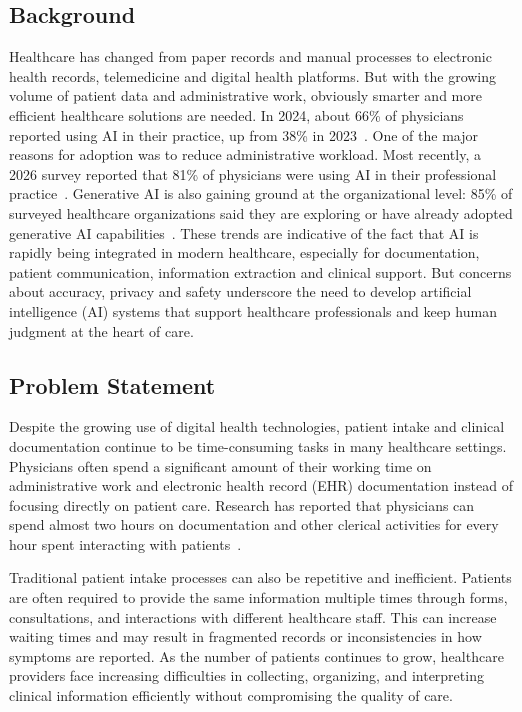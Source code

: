 \documentclass[conference]{IEEEtran}
\begin{document}
\subsection{Background}
Healthcare has changed from paper records and manual processes to electronic health records, telemedicine and digital health platforms. But with the growing volume of patient data and administrative work, obviously smarter and more efficient healthcare solutions are needed. In 2024, about 66\% of physicians reported using AI in their practice, up from 38\% in 2023~\cite{ama2025}. One of the major reasons for adoption was to reduce administrative workload. Most recently, a 2026 survey reported that 81\% of physicians were using AI in their professional practice~\cite{ama2026}. Generative AI is also gaining ground at the organizational level: 85\% of surveyed healthcare organizations said they are exploring or have already adopted generative AI capabilities~\cite{mckinsey2025}. These trends are indicative of the fact that AI is rapidly being integrated in modern healthcare, especially for documentation, patient communication, information extraction and clinical support. But concerns about accuracy, privacy and safety underscore the need to develop artificial intelligence (AI) systems that support healthcare professionals and keep human judgment at the heart of care.

\subsection{Problem Statement}
Despite the growing use of digital health technologies, patient intake and clinical documentation continue to be time-consuming tasks in many healthcare settings. Physicians often spend a significant amount of their working time on administrative work and electronic health record (EHR) documentation instead of focusing directly on patient care. Research has reported that physicians can spend almost two hours on documentation and other clerical activities for every hour spent interacting with patients~\cite{sinsky2016}.

Traditional patient intake processes can also be repetitive and inefficient. Patients are often required to provide the same information multiple times through forms, consultations, and interactions with different healthcare staff. This can increase waiting times and may result in fragmented records or inconsistencies in how symptoms are reported. As the number of patients continues to grow, healthcare providers face increasing difficulties in collecting, organizing, and interpreting clinical information efficiently without compromising the quality of care.
\end{document}
